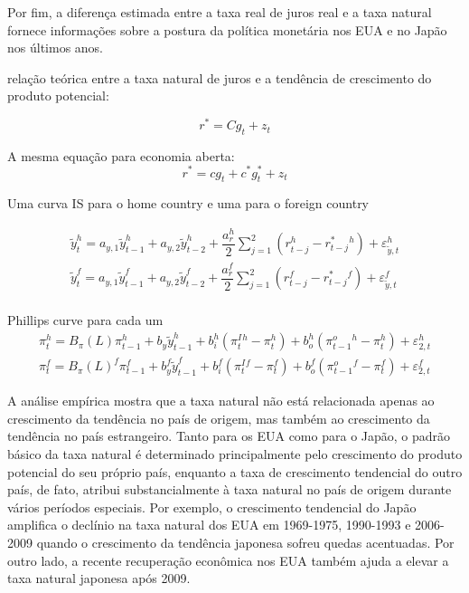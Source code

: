 \documentclass[11pt,oneside,a4paper]{article}
\begin{document}
Por fim, a diferença estimada entre a taxa real de juros real e a taxa natural fornece informações sobre a postura da política monetária nos EUA e no Japão nos últimos anos.

\citet{LW:2003} relação teórica entre a taxa natural de juros e a tendência de crescimento do produto potencial:

\begin{equation}
    r^{*} = C g_t + z_t
\end{equation}

A mesma equação para economia aberta:
\begin{equation}
    r^{*} = c g_t + c^{*} g_t^{*} + z_t
\end{equation}

Uma curva IS para o home country e uma para o foreign country

\begin{eqnarray}
    \tilde{y}_t^{h} = a_{y,1}\tilde{y}_{t-1}^{h} + a_{y,2}\tilde{y}_{t-2}^{h} + \dfrac{a_r^{h}}{2} \sum_{j=1}^{2} (r_{t-j}^{h} - r_{t-j}^{*}^{h}) + \varepsilon_{\tilde{y},t}^{h} \\
    \tilde{y}_t^{f} = a_{y,1}\tilde{y}_{t-1}^{f} + a_{y,2}\tilde{y}_{t-2}^{f} + \dfrac{a_r^{f}}{2} \sum_{j=1}^{2} (r_{t-j}^{f} - r_{t-j}^{*}^{f}) + \varepsilon_{\tilde{y},t}^{f} \\
    
\end{eqnarray}

Phillips curve para cada um
\begin{eqnarray}
    \pi_t^{h} = B_{\pi}(L)\pi_{t-1}^{h} + b_y \tilde{y}_{t-1}^{h} + b_i^{h}(\pi_t^{I}^{h} - \pi_t^{h} ) + b_{o}^{h}(\pi_{t-1}^{o}^{h} - \pi_t^{h}) + \varepsilon_{2,t}^{h} \\
    \pi_t^{f} = B_{\pi}(L)^{f}\pi_{t-1}^{f} + b_y^{f} \tilde{y}_{t-1}^{f} + b_i^{f}(\pi_t^{I}^{f} - \pi_t^{f} ) + b_{o}^{f}(\pi_{t-1}^{o}^{f} - \pi_t^{f}) + \varepsilon_{2,t}^{f}
    
\end{eqnarray}

A análise empírica mostra que a taxa natural não está relacionada apenas ao crescimento da tendência no país de origem, mas também ao crescimento da tendência no país estrangeiro. Tanto para os EUA como para o Japão, o padrão básico da taxa natural é determinado principalmente pelo crescimento do produto potencial do seu próprio país, enquanto a taxa de crescimento tendencial do outro país, de fato, atribui substancialmente à taxa natural no país de origem durante vários períodos especiais. Por exemplo, o crescimento tendencial do Japão amplifica o declínio na taxa natural dos EUA em 1969-1975, 1990-1993 e 2006-2009 quando o crescimento da tendência japonesa sofreu quedas acentuadas. Por outro lado, a recente recuperação econômica nos EUA também ajuda a elevar a taxa natural japonesa após 2009.
%
%
\end{document}
